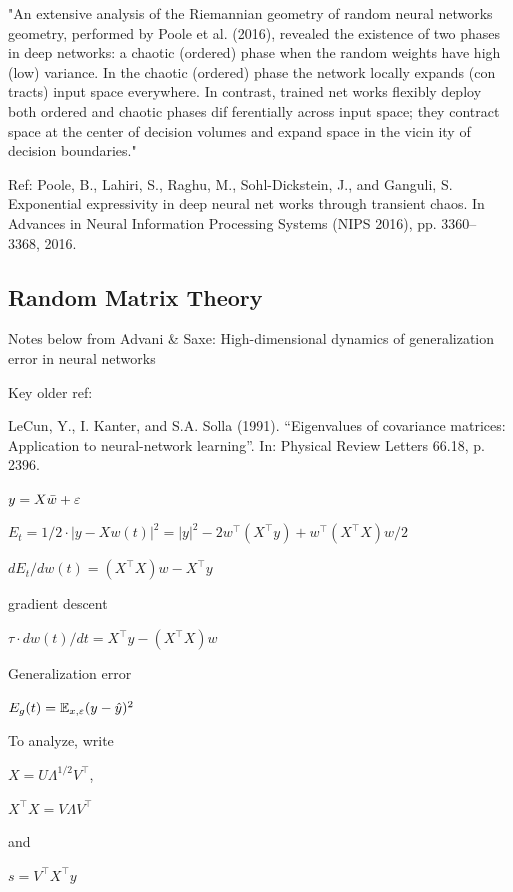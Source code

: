 \documentclass[english]{article}
\begin{document}
\benum
\item "An extensive analysis of the Riemannian geometry of random neural networks  geometry, performed by Poole et al. (2016), revealed the existence of two phases in deep networks: a chaotic (ordered) phase
when the random weights have high (low) variance. In the
chaotic (ordered) phase the network locally expands (con
tracts) input space everywhere. In contrast, trained net
works flexibly deploy both ordered and chaotic phases dif
ferentially across input space; they contract space at the
center of decision volumes and expand space in the vicin
ity of decision boundaries." 

Ref: Poole, B., Lahiri, S., Raghu, M., Sohl-Dickstein, J., and
Ganguli, S. Exponential expressivity in deep neural net
works through transient chaos. In Advances in Neural
Information Processing Systems (NIPS 2016), pp. 3360–
3368, 2016.

\eenum

\subsection{Random Matrix Theory}


\benum
\item Notes below from Advani \& Saxe: High-dimensional dynamics of generalization error
in neural networks
\item Key older ref: 

LeCun, Y., I. Kanter, and S.A. Solla (1991). “Eigenvalues of covariance matrices: Application
to neural-network learning”. In: Physical Review Letters 66.18, p. 2396.

\item  $y = X\bar w+\varepsilon$

$E_t = 1/2\cdot |y-Xw(t)|^2 = |y|^2 - 2 w^\top (X^\top y) + w^\top  (X^\top X) w/2$

$dE_t/dw(t) =   (X^\top X) w - X^\top y $

gradient descent 

$\tau \cdot dw(t)/dt  =   X^\top y - (X^\top X) w$

Generalization error 

$E_g(t) = \mathbb{E}_{x,\varepsilon} (y-\hat y)^2$

\item To analyze, write

$X = U\Lambda^{1/2} V^\top$, 

$X^\top X  = V\Lambda V^\top$

and 

$s = V^\top X^\top y$
\end{document}
